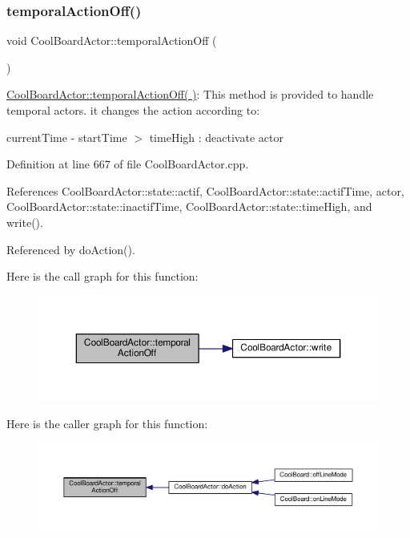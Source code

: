 \subsubsection{\texorpdfstring{temporal\+Action\+Off()}{temporalActionOff()}}
{\footnotesize\ttfamily void Cool\+Board\+Actor\+::temporal\+Action\+Off (\begin{DoxyParamCaption}{ }\end{DoxyParamCaption})}

\hyperlink{class_cool_board_actor_a02698bd647df49cabbe74513d4d88918}{Cool\+Board\+Actor\+::temporal\+Action\+Off( )}\+: This method is provided to handle temporal actors. it changes the action according to\+:

current\+Time -\/ start\+Time $>$ time\+High \+: deactivate actor 

Definition at line 667 of file Cool\+Board\+Actor.\+cpp.



References Cool\+Board\+Actor\+::state\+::actif, Cool\+Board\+Actor\+::state\+::actif\+Time, actor, Cool\+Board\+Actor\+::state\+::inactif\+Time, Cool\+Board\+Actor\+::state\+::time\+High, and write().



Referenced by do\+Action().

Here is the call graph for this function\+:\nopagebreak
\begin{figure}[H]
\begin{center}
\leavevmode
\includegraphics[width=350pt]{dc/d69/class_cool_board_actor_a02698bd647df49cabbe74513d4d88918_cgraph}
\end{center}
\end{figure}
Here is the caller graph for this function\+:\nopagebreak
\begin{figure}[H]
\begin{center}
\leavevmode
\includegraphics[width=350pt]{dc/d69/class_cool_board_actor_a02698bd647df49cabbe74513d4d88918_icgraph}
\end{center}
\end{figure}
\mbox{\label{class_cool_board_actor_ada603785c203fdb0b41cc967d70bdc4d}} 
